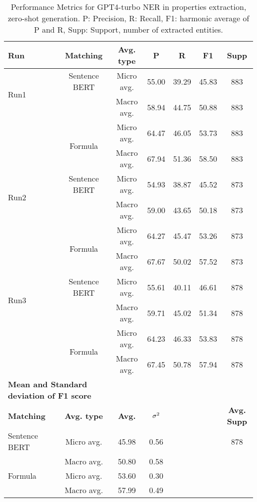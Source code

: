 \begin{table}[htbp]
\small
  \centering
  \caption{Performance Metrics for GPT4-turbo NER in properties extraction, zero-shot generation. P: Precision, R: Recall, F1: harmonic average of P and R, Supp: Support, number of extracted entities.}
  \begin{tabular}{lcccccc}
    \toprule
    \textbf{Run} & \textbf{Matching} & \textbf{Avg. type} & \textbf{P} & \textbf{R} & \textbf{F1} & \textbf{Supp} \\
    \midrule
    \multirow{2}{*}{Run1} & Sentence BERT & Micro avg. & 55.00 & 39.29 & 45.83 & 883 \\
    & & Macro avg. & 58.94 & 44.75 & 50.88 & 883 \\
    \cmidrule{2-7}
    & \multirow{2}{*}{Formula} & Micro avg. & 64.47 & 46.05 & 53.73 & 883 \\
    & & Macro avg. & 67.94 & 51.36 & 58.50 & 883 \\
    \midrule
    \multirow{2}{*}{Run2} & Sentence BERT & Micro avg. & 54.93 & 38.87 & 45.52 & 873 \\
    & & Macro avg. & 59.00 & 43.65 & 50.18 & 873 \\
    \cmidrule{2-7}
    & \multirow{2}{*}{Formula} & Micro avg. & 64.27 & 45.47 & 53.26 & 873 \\
    & & Macro avg. & 67.67 & 50.02 & 57.52 & 873 \\
    \midrule
    \multirow{2}{*}{Run3} & Sentence BERT & Micro avg. & 55.61 & 40.11 & 46.61 & 878 \\
    & & Macro avg. & 59.71 & 45.02 & 51.34 & 878 \\
    \cmidrule{2-7}
    & \multirow{2}{*}{Formula} & Micro avg. & 64.23 & 46.33 & 53.83 & 878 \\
    & & Macro avg. & 67.45 & 50.78 & 57.94 & 878 \\
    \midrule
    \multicolumn{2}{l}{\textbf{Mean and Standard deviation of F1 score}} & & & & & \\
    \midrule
    \textbf{Matching} & \textbf{Avg. type} & \textbf{Avg.} & $\sigma\textsuperscript{2}$ & & & \textbf{Avg. Supp}\\
    Sentence BERT & Micro avg. & 45.98 & 0.56 & & & 878 \\
    & Macro avg. & 50.80 & 0.58 & & & \\
    Formula & Micro avg. & 53.60 & 0.30 & & & \\
    & Macro avg. & 57.99 & 0.49 & & & \\
    \bottomrule
  \end{tabular}
\end{table}


